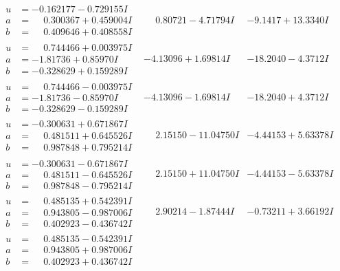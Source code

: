 \documentclass[1p]{elsarticle_modified}
\theoremstyle{definition}
\begin{document}
$$\begin{array}{c|c|c}
\begin{aligned}
u &= -0.162177 - 0.729155 I \\
a &= \phantom{-}0.300367 + 0.459004 I \\
b &= \phantom{-}0.409646 + 0.408558 I\end{aligned}
 & \phantom{-}0.80721 - 4.71794 I & -9.1417 + 13.3340 I \\ \hline\begin{aligned}
u &= \phantom{-}0.744466 + 0.003975 I \\
a &= -1.81736 + 0.85970 I \\
b &= -0.328629 + 0.159289 I\end{aligned}
 & -4.13096 + 1.69814 I & -18.2040 - 4.3712 I \\ \hline\begin{aligned}
u &= \phantom{-}0.744466 - 0.003975 I \\
a &= -1.81736 - 0.85970 I \\
b &= -0.328629 - 0.159289 I\end{aligned}
 & -4.13096 - 1.69814 I & -18.2040 + 4.3712 I \\ \hline\begin{aligned}
u &= -0.300631 + 0.671867 I \\
a &= \phantom{-}0.481511 + 0.645526 I \\
b &= \phantom{-}0.987848 + 0.795214 I\end{aligned}
 & \phantom{-}2.15150 - 11.04750 I & -4.44153 + 5.63378 I \\ \hline\begin{aligned}
u &= -0.300631 - 0.671867 I \\
a &= \phantom{-}0.481511 - 0.645526 I \\
b &= \phantom{-}0.987848 - 0.795214 I\end{aligned}
 & \phantom{-}2.15150 + 11.04750 I & -4.44153 - 5.63378 I \\ \hline\begin{aligned}
u &= \phantom{-}0.485135 + 0.542391 I \\
a &= \phantom{-}0.943805 - 0.987006 I \\
b &= \phantom{-}0.402923 - 0.436742 I\end{aligned}
 & \phantom{-}2.90214 - 1.87444 I & -0.73211 + 3.66192 I \\ \hline\begin{aligned}
u &= \phantom{-}0.485135 - 0.542391 I \\
a &= \phantom{-}0.943805 + 0.987006 I \\
b &= \phantom{-}0.402923 + 0.436742 I\end{aligned}

\end{array}$$
\end{document}
